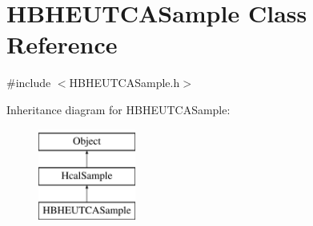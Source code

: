 \hypertarget{class_h_b_h_e_u_t_c_a_sample}{}\section{H\+B\+H\+E\+U\+T\+C\+A\+Sample Class Reference}
\label{class_h_b_h_e_u_t_c_a_sample}


{\ttfamily \#include $<$H\+B\+H\+E\+U\+T\+C\+A\+Sample.\+h$>$}

Inheritance diagram for H\+B\+H\+E\+U\+T\+C\+A\+Sample\+:\begin{figure}[H]
\begin{center}
\leavevmode
\includegraphics[height=3.000000cm]{class_h_b_h_e_u_t_c_a_sample}
\end{center}
\end{figure}
